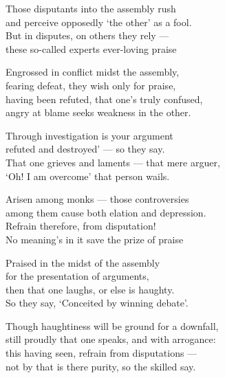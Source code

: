 \begin{MyDescription}{}
Those disputants into the assembly rush\\
and perceive opposedly `the other' as a fool.\\
But in disputes, on others they rely —\\
these so-called experts ever-loving praise
\end{MyDescription}

\begin{MyDescription}{}
Engrossed in conflict midst the assembly,\\
fearing defeat, they wish only for praise,\\
having been refuted, that one's truly confused,\\
angry at blame seeks weakness in the other.
\end{MyDescription}
   
\begin{MyDescription}{}
Through investigation is your argument\\
refuted and destroyed' — so they say.\\
That one grieves and laments — that mere arguer,\\
`Oh! I am overcome' that person wails.
\end{MyDescription}   

\begin{MyDescription}{}
Arisen among monks — those controversies\\
among them cause both elation and depression.\\
Refrain therefore, from disputation!\\
No meaning's in it save the prize of praise
\end{MyDescription}   


\begin{MyDescription}{}
Praised in the midst of the assembly\\
for the presentation of arguments,\\
then that one laughs, or else is haughty.\\
So they say, `Conceited by winning debate'.
\end{MyDescription}

\begin{MyDescription}{}
Though haughtiness will be ground for a downfall,\\
still proudly that one speaks, and with arrogance:\\
this having seen, refrain from disputations —\\
not by that is there purity, so the skilled say.
\end{MyDescription}


